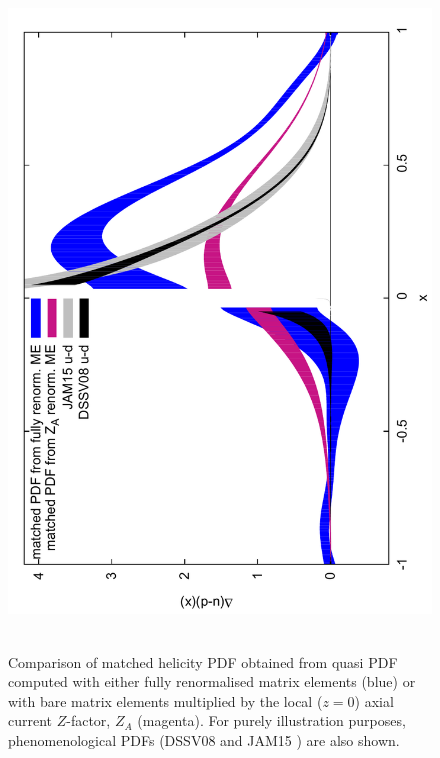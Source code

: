 \begin{figure}[t]
\centering
\includegraphics[scale=0.4,angle=-90]{plots/qmatched_bare_vs_fit69v2}\,\,\,
\vspace*{-0.3cm}
\begin{minipage}{15cm}
\hspace*{3cm}
\caption{\small Comparison of matched helicity PDF obtained from quasi PDF computed with either fully renormalised matrix elements (blue) 
or with bare matrix elements multiplied by the local ($z{=}0$) axial current $Z$-factor, $Z_A$ (magenta). For purely illustration purposes, 
phenomenological PDFs (DSSV08 \cite{deFlorian:2009vb} and JAM15 \cite{Sato:2016tuz}) are also shown.}
\label{fig:matched} 
\end{minipage}
\end{figure}

